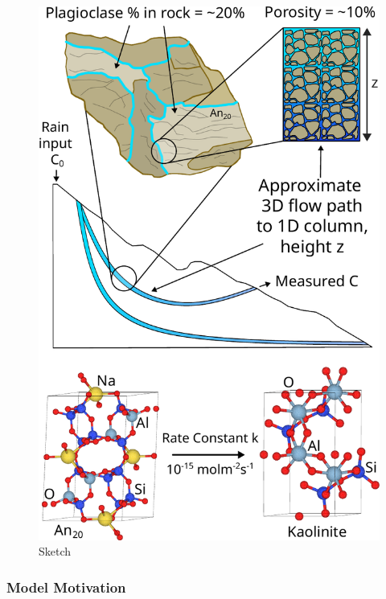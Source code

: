 \begin{figure}[h]
    \centering
    \includegraphics[width=\textwidth]{sketch.pdf}
    \caption{Sketch}
    \label{fig:discussion611}
\end{figure}

\FloatBarrier

\subsubsection*{Model Motivation}


